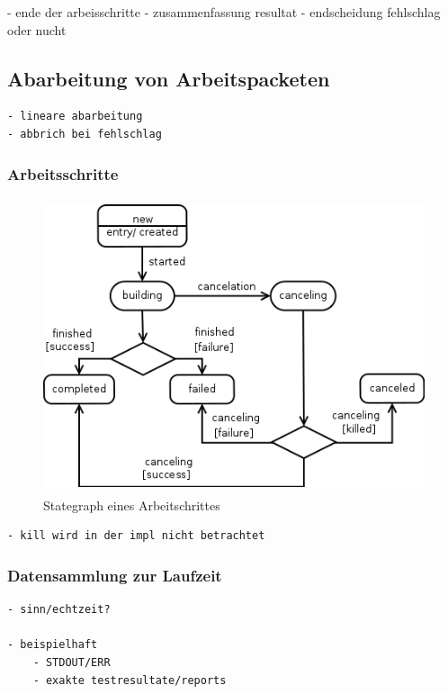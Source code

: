 - ende der arbeisschritte
- zusammenfassung resultat
- endscheidung fehlschlag oder nucht


\subsection{Abarbeitung von Arbeitspacketen}

\begin{verbatim}
- lineare abarbeitung
- abbrich bei fehlschlag
\end{verbatim}

\subsubsection{Arbeitsschritte}


\begin{figure}[ht] 
  \centering
  \label{fig:lebenszyklus-arbeitsschritt}
  \includegraphics[height=3.4in]{imageinput/lebenszyklus-arbeitsschritt.png}
  \caption{Stategraph eines Arbeitschrittes}
\end{figure}

\begin{verbatim}
- kill wird in der impl nicht betrachtet

\end{verbatim}


\subsubsection{Datensammlung zur Laufzeit}

\begin{verbatim}
- sinn/echtzeit?

- beispielhaft
    - STDOUT/ERR
    - exakte testresultate/reports
\end{verbatim}


